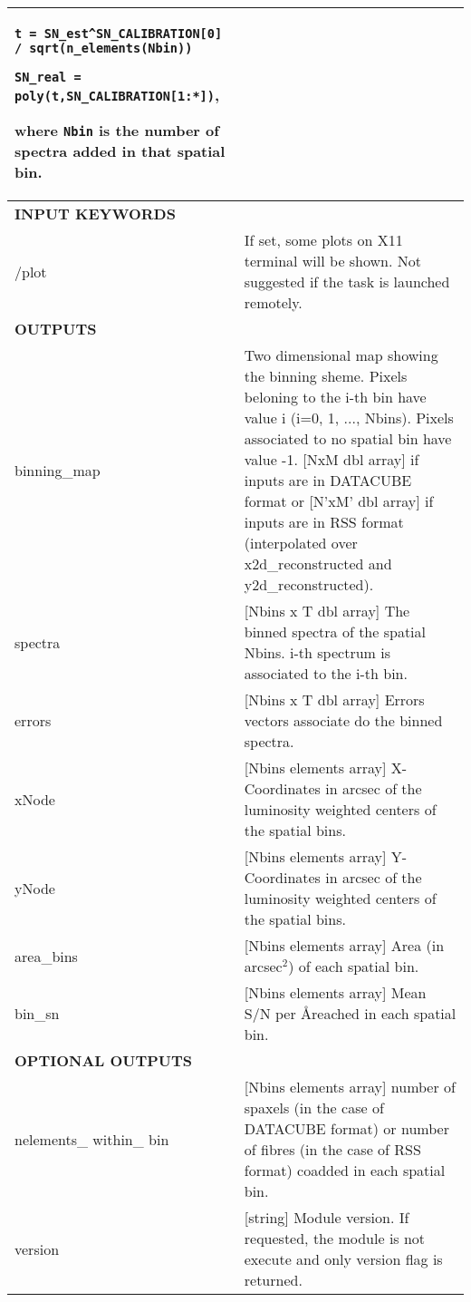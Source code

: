 \begin{center}
\begin{longtable}{p{2.7cm}| p{11.1cm} }
                               \medskip

                    {\tt t = SN\_est\textasciicircum SN\_CALIBRATION[0] / sqrt(n\_elements(Nbin))}

                    {\tt SN\_real = poly(t,SN\_CALIBRATION[1:*])}, 

                    where {\tt Nbin} is the number of spectra added in that spatial bin.\\

\hline
{\bf INPUT KEYWORDS} & \\
\hline
%
/plot        &       If set, some plots on X11 terminal will be shown. Not suggested if the task is launched remotely. \\
%
\hline
{\bf OUTPUTS} & \\
\hline
%
binning\_map & Two dimensional map showing the binning sheme. Pixels beloning to the i-th bin have value i (i=0, 1, ..., Nbins). 
             Pixels associated to no spatial bin have value -1.  
             [NxM dbl array] if inputs are in DATACUBE format or [N'xM' dbl array] if inputs are in RSS format (interpolated 
             over x2d\_reconstructed and y2d\_reconstructed).\\
%
spectra   &  [Nbins x T dbl array]    The binned spectra of the spatial Nbins. i-th spectrum is associated to the i-th bin. \\
%
errors    &  [Nbins x T dbl array]    Errors vectors associate do the binned spectra. \\
%
xNode     &  [Nbins elements array]   X-Coordinates in arcsec of the luminosity weighted centers of the spatial bins. \\
%
yNode     &  [Nbins elements array]   Y-Coordinates in arcsec of the luminosity weighted centers of the spatial bins. \\
%
area\_bins &  [Nbins elements array]   Area (in arcsec$^2$) of each spatial bin.  \\
%
bin\_sn   &  [Nbins elements array]   Mean S/N per \AA reached in each spatial bin. \\
%
\hline
{\bf OPTIONAL OUTPUTS} & \\
\hline
%
 nelements\_ within\_ bin & [Nbins elements array] number of spaxels (in the case of DATACUBE format) or number of fibres (in the case of RSS format) coadded in each spatial bin.\\
%
 version   & [string]            Module version. If requested, the module is not execute and only version flag is returned.\\
\hline
\end{longtable}
\end{center}



